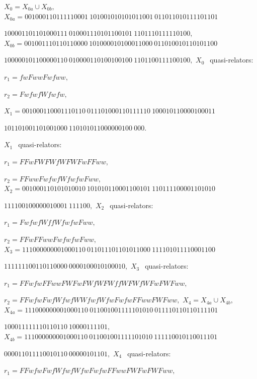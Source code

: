 \begin{remark}
\begin{proposition}

 \noindent $X_0 = X_{0a} \cup X_{0b},$
\noindent $X_{0a} = 
001000110111110001\ 
101001010101011001\ 
011011010111101101$\hfill 

 
 \hfill
$100001101101000111\ 
010001110101100101\ 
1101110111110100,$  
 \noindent $X_{0b} = 
001001110110110000\ 
101000010100011000\ 
011010010110101100$

\hfill
$100000101100000110\ 
010000110100100100\ 
1101100111100100,$ 
 \vglue4pt
\noindent  $X_0\ \ $ quasi\/{\textrm -}\/relators\/{\textrm :}

$r_1 = fwFwwFwfww,$
 
$r_2 = FwfwfWfwfw,$

\vglue8pt
\noindent $X_1 = 
001000110001110110\ 
011101000110111110\ 
100010110000100011$\hfill 

\hfill $
101101001101001000\ 
110101011000000100\ 
000.$ 

\noindent $X_1\ \ 
$ quasi\/{\textrm -}\/relators\/{\textrm :}

$r_1 = FFwFWFWfWFWFwFFww,$
 
$r_2 = FFwwFwfwfWfwfwFww,$
\vglue4pt
\noindent $X_2 = 
001000110101010010\ 
101010110001100101\ 
110111100001101010$\hfill

\hfill $111100100000010001\ 
111100,$
\noindent $X_2\ \ $ quasi\/{\textrm -}\/relators\/{\textrm :}

$r_1 = FwfwfWffWfwfwFww,$

$r_2 = FFwFFwwFwfwfwFww,$
\noindent 
$X_3 = 
111000000001000110\ 
011011101101011000\ 
111101011110001100$\hfill

\hfill  
$111111100110110000\ 
0000100010100010,$
\noindent $X_3\ \ $ quasi\/{\textrm -}\/relators\/{\textrm :}\/

$r_1 = FFwfwFFwwFWFwFWfWFWffWFWfWFwFWFww,$ 

$r_2 = FFwfwFwfWfwfWWfwfWfwFwfwFFwwFWFww,$
\vglue4pt 
\noindent $X_4 = X_{4a} \cup X_{4b},$
\vglue4pt
\noindent $X_{4a} = 
111000000001000110\ 
011001001111101010\ 
011110110110111101$\hfill

\hfill  
$100011111110110110\ 
10000111101,$
\vglue4pt
\noindent $X_{4b} = 
111000000001000110\ 
011001001111101010\ 
111110010110011101$\hfill

\hfill  
$000011011110010110\ 
00000101101,$
\vglue4pt
\noindent $X_4\ \ $ quasi\/{\textrm -}\/relators\/{\textrm :}

$r_1 = FFwfwFwfWfwfWfwFwfwFFwwFWFwFWFww,$


\end{proposition}
\end{remark}
